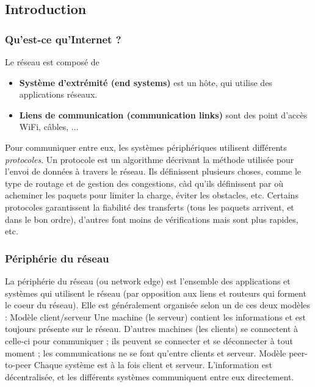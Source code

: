 \subsection{Introduction}



\subsubsection{Qu'est-ce qu'Internet ?}
Le réseau est composé de
\begin{itemize}
	\item \textbf{Système d'extrémité (end systems)} est un hôte, qui utilise des applications réseaux.
    \item \textbf{Liens de communication (communication links)} sont des point d'accès WiFi, câbles, ...
\end{itemize}
Pour communiquer entre eux, les systèmes périphériques utilisent différents \textit{protocoles}.
Un protocole est un algorithme décrivant la méthode utilisée pour l'envoi de données à
travers le réseau. Ils définissent plusieurs choses, comme le type de routage et de gestion
des congestions, càd qu'ils définissent par où acheminer les paquets pour limiter la charge,
éviter les obstacles, etc. Certains protocoles garantissent la fiabilité des transferts (tous
les paquets arrivent, et dans le bon ordre), d'autres font moins de vérifications mais sont
plus rapides, etc.



\subsubsection{Périphérie du réseau}
La périphérie du réseau (ou network edge) est l'ensemble des applications et systèmes
qui utilisent le réseau (par opposition aux liens et routeurs qui forment le coeur du réseau).
Elle est généralement organisée selon un de ces deux modèles :
Modèle client/serveur Une machine (le serveur) contient les informations et est toujours
présente sur le réseau. D'autres machines (les clients) se connectent à celle-ci
pour communiquer ; ils peuvent se connecter et se déconnecter à tout moment ; les
communications ne se font qu'entre clients et serveur.
Modèle peer-to-peer Chaque système est à la fois client et serveur. L'information est
décentralisée, et les différents systèmes communiquent entre eux directement.



